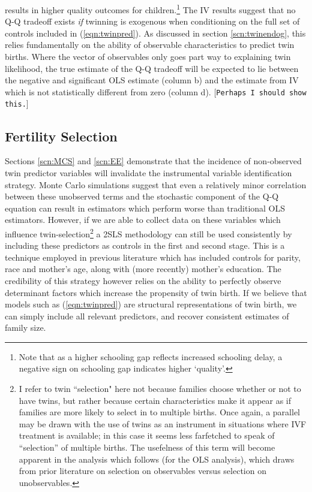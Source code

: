 \documentclass{article}[11pt,subeqn]
\begin{document}
\begin{spacing}{1.25}
results in higher quality outcomes for children.\footnote{Note that as a higher schooling gap reflects increased schooling delay, a negative sign on schooling gap indicates higher
`quality'.}  The IV results suggest that no Q-Q tradeoff exists \emph{if} twinning is exogenous when conditioning on the full set of controls included in (\ref{eqn:twinpred}).  As 
discussed in section \ref{scn:twinendog}, this relies fundamentally on the ability of observable characteristics to predict twin births.  Where the vector of observables only goes
part way to explaining twin likelihood, the true estimate of the Q-Q tradeoff will be expected to lie between the negative and significant OLS estimate (column b) and the estimate 
from IV which is not statistically different from zero (column d). [\texttt{Perhaps I should show this.}]


\subsection{Fertility Selection}
\label{scn:selection}
Sections \ref{scn:MCS} and \ref{scn:EE} demonstrate that the incidence of non-observed twin predictor variables will invalidate the instrumental variable identification strategy.  
Monte Carlo simulations suggest that even a relatively minor correlation between these unobserved terms and the stochastic component of the Q-Q equation can result in estimators 
which perform worse than traditional OLS estimators.  However, if we are able to collect data on these variables which influence twin-selection\footnote{I refer to twin ``selection" 
here not because families choose whether or not to have twins, but rather because certain characteristics make it appear as if families are more likely to select in to multiple 
births.  Once again, a parallel may be drawn with the use of twins as an instrument in situations where IVF treatment is available; in this case it seems less farfetched to speak 
of ``selection'' of multiple births.  The usefelness of this term will become apparent in the analysis which follows (for the OLS analysis), which draws from prior literature on 
selection on observables versus selection on unobservables.} a 2SLS methodology can still be used consistently by including these predictors as controls in the first and second 
stage.  This is a technique employed in previous literature which has included controls for parity, race and mother's age, along with (more recently) mother's education.  The 
credibility of this strategy however relies on the ability to perfectly observe determinant factors which increase the propensity of twin birth.  If we believe that models such 
as (\ref{eqn:twinpred}) are structural representations of twin birth, we can simply include all relevant predictors, and recover consistent estimates of family size.


\end{spacing}
\end{document}
